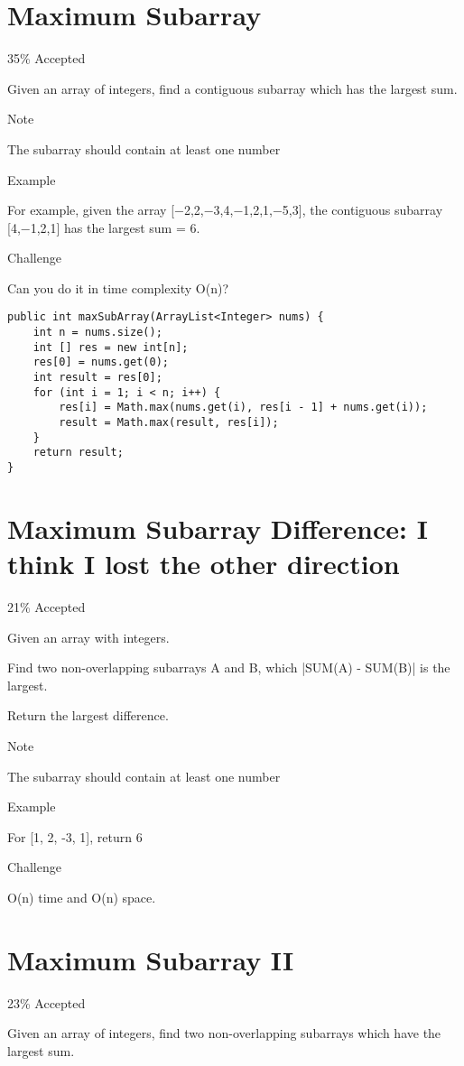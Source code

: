 \documentclass[9pt, b5paaper]{book}
\begin{document}
\section{Maximum Subarray}
\label{sec-5-39}

35\% Accepted

Given an array of integers, find a contiguous subarray which has the largest sum.

Note

The subarray should contain at least one number

Example

For example, given the array [−2,2,−3,4,−1,2,1,−5,3], the contiguous subarray [4,−1,2,1] has the largest sum = 6.

Challenge

Can you do it in time complexity O(n)?
\begin{verbatim}
public int maxSubArray(ArrayList<Integer> nums) {
    int n = nums.size();
    int [] res = new int[n];
    res[0] = nums.get(0);
    int result = res[0];
    for (int i = 1; i < n; i++) {
        res[i] = Math.max(nums.get(i), res[i - 1] + nums.get(i));
        result = Math.max(result, res[i]);
    }
    return result;
}
\end{verbatim}
\section{Maximum Subarray Difference: I think I lost the other direction}
\label{sec-5-40}

21\% Accepted

Given an array with integers.

Find two non-overlapping subarrays A and B, which |SUM(A) - SUM(B)| is the largest.

Return the largest difference.

Note

The subarray should contain at least one number

Example

For [1, 2, -3, 1], return 6

Challenge

O(n) time and O(n) space.
\section{Maximum Subarray II}
\label{sec-5-41}

23\% Accepted

Given an array of integers, find two non-overlapping subarrays which have the largest sum.
\end{document}

